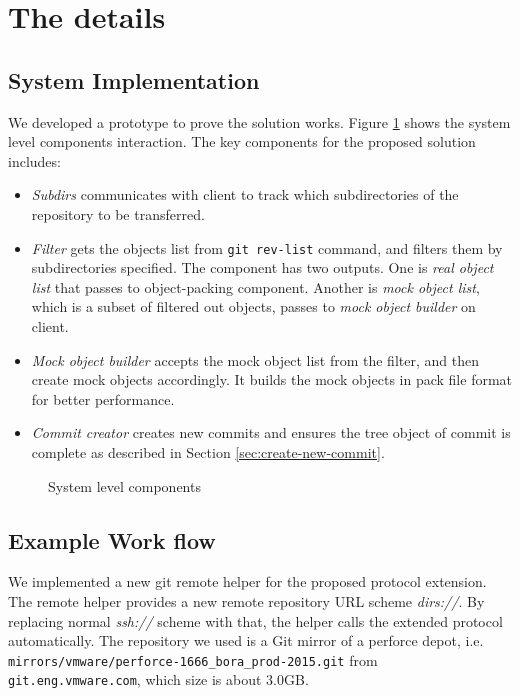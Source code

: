 \documentclass[preprint]{sigplanconf}
\begin{document}
\section{The details}
\subsection{System Implementation}
We developed a prototype to prove the solution works.
Figure \ref{fig:components} shows the system level components interaction.
The key components for the proposed solution includes:
\begin{itemize}
  \item \emph{Subdirs} communicates with client to track which subdirectories
    of the repository to be transferred.

  \item \emph{Filter} gets the objects list from
    \verb|git rev-list| command, and filters them by subdirectories specified.
    The component has two outputs.
    One is \emph{real object list} that passes to object-packing component.
    Another is \emph{mock object list}, which is a subset of filtered out
    objects, passes to \emph{mock object builder} on client.

  \item \emph{Mock object builder} accepts the mock object list
    from the filter, and then create mock objects accordingly.
    It builds the mock objects in pack file format\cite{packformat} for better
    performance.

  \item \emph{Commit creator} creates new commits and ensures
    the tree object of commit is complete as described in Section
    \ref{sec:create-new-commit}.
\end{itemize}
\begin{figure}[htpb]
  \centering
  
  \caption{System level components}
  \label{fig:components}
\end{figure}

\subsection{Example Work flow}
We implemented a new git remote helper\cite{git-remote-helper} for the proposed
protocol extension.
The remote helper provides a new remote repository URL scheme \emph{dirs://}.
By replacing normal \emph{ssh://} scheme with that, the helper calls the
extended protocol automatically.
The repository we used is a Git mirror of a perforce depot, i.e.\\
\verb|mirrors/vmware/perforce-1666_bora_prod-2015.git| from
\verb|git.eng.vmware.com|, which size is about 3.0GB.
\end{document}

